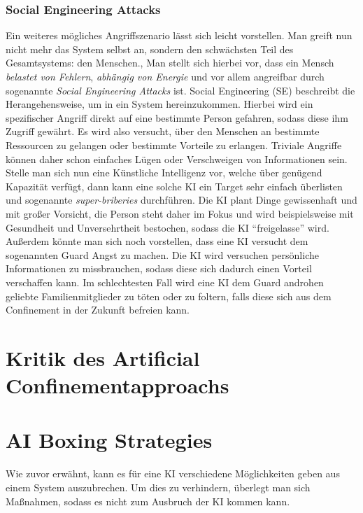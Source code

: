         \subsubsection{Social Engineering Attacks}\label{section:sea}
        Ein weiteres mögliches Angriffszenario lässt sich leicht vorstellen. Man greift nun nicht mehr das System selbst
        an, sondern den schwächsten Teil des Gesamtsystems: den Menschen.\cite{armstrongforthcoming}, \cite{yampolskiy2012leakproofing}
        Man stellt sich hierbei vor, dass ein Mensch \textit{belastet von Fehlern}, \textit{abhängig von Energie}
        und vor allem angreifbar durch sogenannte \textit{Social Engineering Attacks} ist. Social Engineering (SE)
        beschreibt die Herangehensweise, um in ein System hereinzukommen. Hierbei wird ein spezifischer Angriff direkt
        auf eine bestimmte Person gefahren, sodass diese ihm Zugriff gewährt. \cite{yampolskiy2012leakproofing} Es wird
        also versucht, über den Menschen an bestimmte Ressourcen zu gelangen oder bestimmte Vorteile zu erlangen. Triviale
        Angriffe können daher schon einfaches Lügen oder Verschweigen von Informationen sein.
        Stelle man sich nun eine Künstliche Intelligenz vor, welche über genügend Kapazität verfügt, dann kann eine solche
        KI ein Target sehr einfach überlisten und sogenannte \textit{super-briberies} durchführen. \cite{yampolskiy2012leakproofing}
        Die KI plant Dinge gewissenhaft und mit großer Vorsicht, die Person steht daher im Fokus und wird beispielsweise
        mit Gesundheit und Unversehrtheit bestochen, sodass die KI ``freigelasse'' wird. Außerdem könnte man sich noch
        vorstellen, dass eine KI versucht dem sogenannten Guard Angst zu machen. Die KI wird versuchen persönliche
        Informationen zu missbrauchen, sodass diese sich dadurch einen Vorteil verschaffen kann. Im schlechtesten Fall
        wird eine KI dem Guard androhen geliebte Familienmitglieder zu töten oder zu foltern, falls diese sich aus dem
        Confinement in der Zukunft befreien kann.

        \section{Kritik des Artificial Confinementapproachs}

    \section{AI Boxing Strategies}
        Wie zuvor erwähnt, kann es für eine KI verschiedene Möglichkeiten geben aus einem System auszubrechen. Um dies
        zu verhindern, überlegt man sich Maßnahmen, sodass es nicht zum Ausbruch der KI kommen kann.

